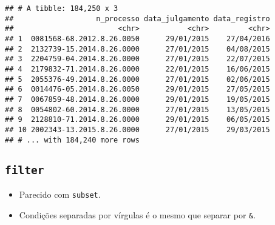 \documentclass[]{book}
\newenvironment{Shaded}{\begin{snugshade}}{\end{snugshade}}
\newcommand{\KeywordTok}[1]{\textcolor[rgb]{0.13,0.29,0.53}{\textbf{{#1}}}}
\newcommand{\DataTypeTok}[1]{\textcolor[rgb]{0.13,0.29,0.53}{{#1}}}
\newcommand{\StringTok}[1]{\textcolor[rgb]{0.31,0.60,0.02}{{#1}}}
\newcommand{\NormalTok}[1]{{#1}}
\providecommand{\tightlist}{%
  \setlength{\itemsep}{0pt}\setlength{\parskip}{0pt}}
\begin{document}
\begin{Shaded}
\end{Shaded}

\begin{verbatim}
## # A tibble: 184,250 x 3
##                   n_processo data_julgamento data_registro
##                        <chr>           <chr>         <chr>
## 1  0081568-68.2012.8.26.0050      29/01/2015    27/04/2016
## 2  2132739-15.2014.8.26.0000      27/01/2015    04/08/2015
## 3  2204759-04.2014.8.26.0000      27/01/2015    22/07/2015
## 4  2179832-71.2014.8.26.0000      22/01/2015    16/06/2015
## 5  2055376-49.2014.8.26.0000      27/01/2015    02/06/2015
## 6  0014476-05.2014.8.26.0050      29/01/2015    27/05/2015
## 7  0067859-48.2014.8.26.0000      29/01/2015    19/05/2015
## 8  0054802-60.2014.8.26.0000      27/01/2015    13/05/2015
## 9  2128810-71.2014.8.26.0000      29/01/2015    06/05/2015
## 10 2002343-13.2015.8.26.0000      27/01/2015    29/03/2015
## # ... with 184,240 more rows
\end{verbatim}

\subsection{\texorpdfstring{\texttt{filter}}{filter}}\label{filter}

\begin{itemize}
\tightlist
\item
  Parecido com \texttt{subset}.
\item
  Condições separadas por vírgulas é o mesmo que separar por
  \texttt{\&}.
\end{itemize}

\begin{Shaded}
\end{Shaded}
\end{document}
